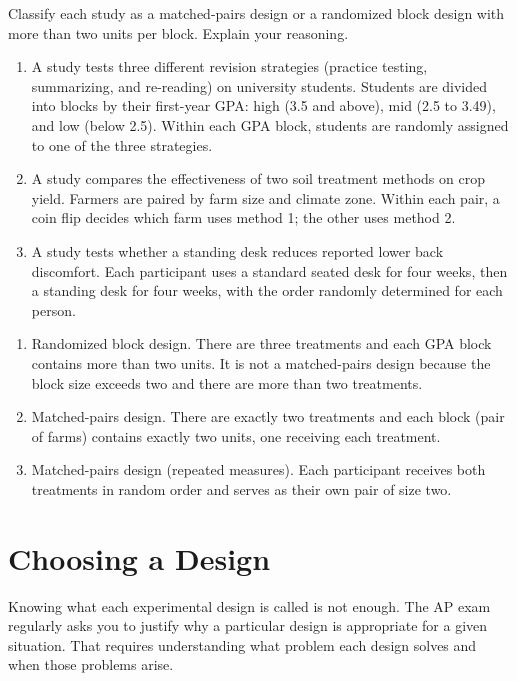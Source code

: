 \begin{Exercise}[title={Matched Pairs or Randomized Block?}, label={ex:mp-block}]
Classify each study as a matched-pairs design or a randomized block design with more than two units per block. Explain your reasoning.

\begin{enumerate} 
    \item A study tests three different revision strategies (practice testing, summarizing, and re-reading) on university students. Students are divided into blocks by their first-year GPA: high (3.5 and above), mid (2.5 to 3.49), and low (below 2.5). Within each GPA block, students are randomly assigned to one of the three strategies.
    \item A study compares the effectiveness of two soil treatment methods on crop yield. Farmers are paired by farm size and climate zone. Within each pair, a coin flip decides which farm uses method 1; the other uses method 2.
    \item A study tests whether a standing desk reduces reported lower back discomfort. Each participant uses a standard seated desk for four weeks, then a standing desk for four weeks, with the order randomly determined for each person.
\end{enumerate}
\end{Exercise}
\begin{Answer}[ref={ex:mp-block}]
\begin{enumerate} 
    \item Randomized block design. There are three treatments and each GPA block contains more than two units. It is not a matched-pairs design because the block size exceeds two and there are more than two treatments.
    \item Matched-pairs design. There are exactly two treatments and each block (pair of farms) contains exactly two units, one receiving each treatment.
    \item Matched-pairs design (repeated measures). Each participant receives both treatments in random order and serves as their own pair of size two.
\end{enumerate}
\end{Answer}


\section{Choosing a Design}

Knowing what each experimental design is called is not enough. The AP exam regularly asks you to justify why a particular design is appropriate for a given situation. That requires understanding what problem each design solves and when those problems arise.

